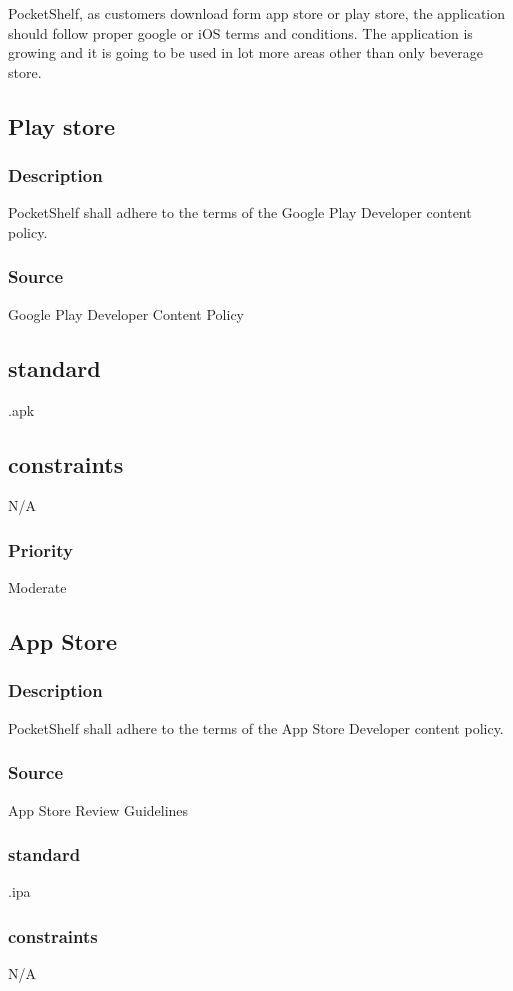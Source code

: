 PocketShelf, as customers download form app store or play store, the application should follow proper google or iOS terms and conditions. The application is growing and it is going to be used in lot more areas other than only beverage store.
\subsection{Play store}

\subsubsection{Description}
PocketShelf shall adhere to the terms of the Google Play Developer content policy.
\subsubsection{Source}
 Google Play Developer Content Policy 
 \subsection{standard}
 .apk
 \subsection{constraints}
 N/A
\subsubsection{Priority}
Moderate\\


\subsection{App Store}
\subsubsection{Description}
PocketShelf shall adhere to the terms of the App Store Developer content policy.
\subsubsection{Source}
App Store Review Guidelines
\subsubsection{standard}
 .ipa
 \subsubsection{constraints}
 N/A

